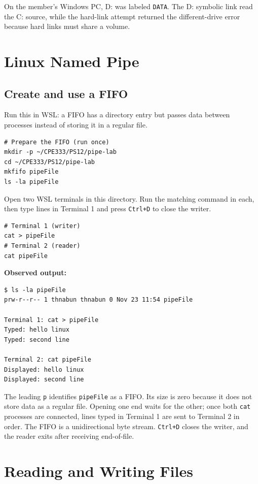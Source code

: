 \documentclass[a4paper,11pt]{article}
\begin{document}
On the member's Windows PC, D: was labeled \texttt{DATA}. The D: symbolic link
read the C: source, while the hard-link attempt returned the different-drive
error because hard links must share a volume.

\section{Linux Named Pipe}

\subsection{Create and use a FIFO}
Run this in WSL: a FIFO has a directory entry but passes data between processes
instead of storing it in a regular file.

\begin{lstlisting}
# Prepare the FIFO (run once)
mkdir -p ~/CPE333/PS12/pipe-lab
cd ~/CPE333/PS12/pipe-lab
mkfifo pipeFile
ls -la pipeFile
\end{lstlisting}

Open two WSL terminals in this directory. Run the matching command in each,
then type lines in Terminal 1 and press \texttt{Ctrl+D} to close the writer.
\begin{lstlisting}
# Terminal 1 (writer)
cat > pipeFile
# Terminal 2 (reader)
cat pipeFile
\end{lstlisting}

\noindent\textbf{Observed output:}
\begin{lstlisting}
$ ls -la pipeFile
prw-r--r-- 1 thnabun thnabun 0 Nov 23 11:54 pipeFile

Terminal 1: cat > pipeFile
Typed: hello linux
Typed: second line

Terminal 2: cat pipeFile
Displayed: hello linux
Displayed: second line
\end{lstlisting}

The leading \texttt{p} identifies \texttt{pipeFile} as a FIFO. Its size is zero
because it does not store data as a regular file. Opening one end waits for the
other; once both \texttt{cat} processes are connected, lines typed in Terminal 1
are sent to Terminal 2 in order. The FIFO is a unidirectional byte stream.
\texttt{Ctrl+D} closes the writer, and the reader exits after receiving
end-of-file.

\section{Reading and Writing Files}
\end{document}

